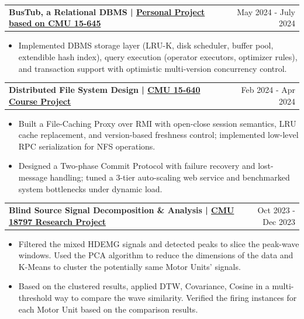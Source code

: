 \documentclass[a4paper,20pt]{article}
\makeatletter
\newcommand{\resumeProjectsSubHeading}[2]{
  \resumeProjectsSubHeadingItem{#1}{#2}
  \vspace{-10pt}
}
\newcommand{\resumeProjectsSubHeadingItem}[2]{
  \vspace{-1pt}
  \item{
    \begin{tabular*} {0.98\textwidth} {@{\hspace{-0.5em}}l@{\extracolsep{\fill}}r}
      \textbf{#1} & {#2} \\
    \end{tabular*}
  \vspace{-8pt}
  }
}
\newcommand{\resumeProjectsItemListStart}{
  \begin{itemize} [leftmargin=*]
}
\newcommand{\resumeProjectsItemListEnd}{
  \end{itemize}
  \vspace{0pt}
}
\newcommand{\resumeProjectsItem}[1]{
  \item{
    {#1} \vspace{-2pt}
  }
}
\makeatother
\begin{document}
\resumeProjectsSubHeading{{BusTub, a Relational DBMS} {| \href{https://github.com/Guo-lab/15645-Database}{Personal Project based on CMU 15-645 \faIcon{github}}}}{May 2024 - July 2024}
\resumeProjectsItemListStart
\resumeProjectsItem{Implemented DBMS storage layer (LRU-K, disk scheduler, buffer   
    pool, extendible hash index), query execution (operator executors,     
    optimizer rules), and transaction support with optimistic multi-version
     concurrency control. }
\resumeProjectsItemListEnd

\vspace{-3pt}

\resumeProjectsSubHeading{{Distributed File System Design} {| \href{https://github.com/Guo-lab/15640-Distributed-Systems}{CMU 15-640 Course Project \faIcon{github}}}}{Feb 2024 - Apr 2024}
\resumeProjectsItemListStart
\resumeProjectsItem{Built a File-Caching Proxy over RMI with open-close session semantics, LRU cache replacement, and version-based freshness control; implemented low-level RPC serialization for NFS operations.}
\resumeProjectsItem{Designed a Two-phase Commit Protocol with failure recovery and lost-message handling; tuned a 3-tier auto-scaling web service and benchmarked system bottlenecks under dynamic load.}
\resumeProjectsItemListEnd

\resumeProjectsSubHeading{Blind Source Signal Decomposition \& Analysis | \href{https://github.com/Guo-lab/MLSP-G2}{CMU 18797 Research Project \faIcon{github}}}{Oct 2023 - Dec 2023}
\resumeProjectsItemListStart
\resumeProjectsItem{Filtered the mixed HDEMG signals and detected peaks to slice the peak-wave windows. Used the PCA algorithm to reduce the dimensions of the data and K-Means to cluster the potentially same Motor Units' signals.}
\resumeProjectsItem{Based on the clustered results, applied DTW, Covariance, Cosine in a multi-threshold way to compare the wave similarity. Verified the firing instances for each Motor Unit based on the comparison results.}
\resumeProjectsItemListEnd
\end{document}

